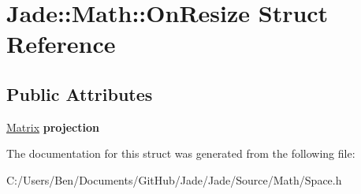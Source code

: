 \hypertarget{struct_jade_1_1_math_1_1_on_resize}{}\section{Jade\+:\+:Math\+:\+:On\+Resize Struct Reference}
\label{struct_jade_1_1_math_1_1_on_resize}
\subsection*{Public Attributes}
\begin{DoxyCompactItemize}
\item 
\hypertarget{struct_jade_1_1_math_1_1_on_resize_ae4073cea394b68822c6a707fd4ae1afe}{}\hyperlink{struct_jade_1_1_math_1_1_matrix}{Matrix} {\bfseries projection}\label{struct_jade_1_1_math_1_1_on_resize_ae4073cea394b68822c6a707fd4ae1afe}

\end{DoxyCompactItemize}


The documentation for this struct was generated from the following file\+:\begin{DoxyCompactItemize}
\item 
C\+:/\+Users/\+Ben/\+Documents/\+Git\+Hub/\+Jade/\+Jade/\+Source/\+Math/Space.\+h\end{DoxyCompactItemize}
